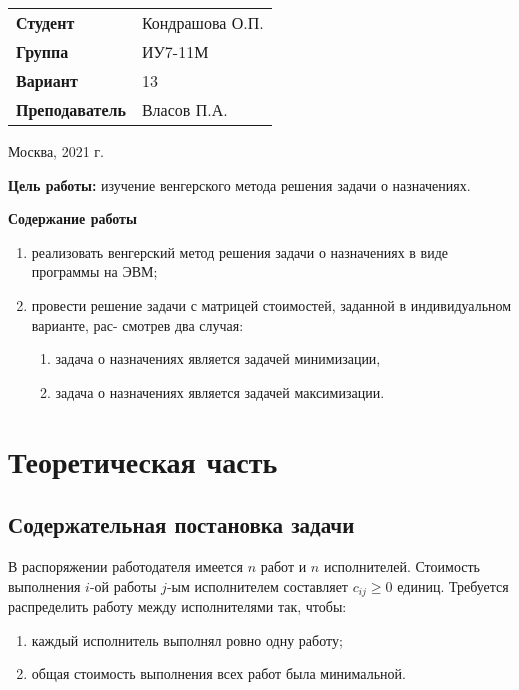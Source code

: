 \documentclass[a4paper,14pt]{article}
\begin{document}
\begin{titlepage}
    \vspace{3cm}

    \begin{flushleft}
        \begin{tabular}{ll}
            \textbf{Студент} & Кондрашова О.П. \\
            \textbf{Группа} & ИУ7-11М \\
             \textbf{Вариант} & 13 \\
            \textbf{Преподаватель} & Власов П.А. \\
        \end{tabular}
    \end{flushleft}

    \vspace{7cm}

   \begin{center}
        Москва, 2021 г.
    \end{center}

\end{titlepage}


\textbf{Цель работы: } изучение венгерского метода решения задачи о назначениях.

\textbf{Содержание работы}
\begin{enumerate}
\item реализовать венгерский метод решения задачи о назначениях в виде программы на ЭВМ;
\item провести решение задачи с матрицей стоимостей, заданной в индивидуальном варианте, рас-
смотрев два случая:
\begin{enumerate}
\item задача о назначениях является задачей минимизации,
\item задача о назначениях является задачей максимизации.
\end{enumerate}
\end{enumerate}

\section{Теоретическая часть}

\subsection{Содержательная постановка задачи}

В распоряжении работодателя имеется $n$ работ и $n$ исполнителей. Стоимость выполнения $i$-ой работы $j$-ым исполнителем составляет $c_{ij} \geq 0$ единиц. Требуется распределить работу между исполнителями так, чтобы:
\begin{enumerate}
\item каждый исполнитель выполнял ровно одну работу;
\item общая стоимость выполнения всех работ была минимальной.
\end{enumerate}
\end{document}
